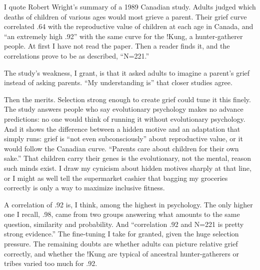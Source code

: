
I quote Robert Wright's summary of a 1989 Canadian study. Adults judged which deaths of children of various ages would most grieve a parent. Their grief curve correlated .64 with the reproductive value of children at each age in Canada, and ``an extremely high .92'' with the same curve for the !Kung, a hunter-gatherer people.  At first I have not read the paper. Then a reader finds it, and the correlations prove to be as described, ``N=221.''

The study's weakness, I grant, is that it asked adults to imagine a parent's grief instead of asking parents. ``My understanding is'' that closer studies agree. 

Then the merits. Selection strong enough to create grief could tune it this finely. The study answers people who say evolutionary psychology makes no advance predictions: no one would think of running it without evolutionary psychology. And it shows the difference between a hidden motive and an adaptation that simply runs: grief is ``not even subconsciously'' about reproductive value, or it would follow the Canadian curve. ``Parents care about children for their own sake.'' That children carry their genes is the evolutionary, not the mental, reason such minds exist. I draw my cynicism about hidden motives sharply at that line, or I might as well tell the supermarket cashier that bagging my groceries correctly is only a way to maximize inclusive fitness. 

A correlation of .92 is, I think, among the highest in psychology. The only higher one I recall, .98, came from two groups answering what amounts to the same question, similarity and probability. And ``correlation .92 and N=221 is pretty strong evidence.''  The fine-tuning I take for granted, given the huge selection pressure. The remaining doubts are whether adults can picture relative grief correctly, and whether the !Kung are typical of ancestral hunter-gatherers or tribes varied too much for .92.

